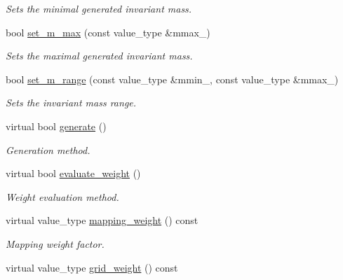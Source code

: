 \begin{DoxyCompactItemize}
\begin{DoxyCompactList}\small\item\em Sets the minimal generated invariant mass. \end{DoxyCompactList}\item 
\hypertarget{a00482_a5df44d35199be994a86c11ba77e98977}{bool \hyperlink{a00482_a5df44d35199be994a86c11ba77e98977}{set\-\_\-m\-\_\-max} (const value\-\_\-type \&mmax\-\_\-)}\label{a00482_a5df44d35199be994a86c11ba77e98977}

\begin{DoxyCompactList}\small\item\em Sets the maximal generated invariant mass. \end{DoxyCompactList}\item 
\hypertarget{a00482_a20f09719b50759cf0a7d9367d399820d}{bool \hyperlink{a00482_a20f09719b50759cf0a7d9367d399820d}{set\-\_\-m\-\_\-range} (const value\-\_\-type \&mmin\-\_\-, const value\-\_\-type \&mmax\-\_\-)}\label{a00482_a20f09719b50759cf0a7d9367d399820d}

\begin{DoxyCompactList}\small\item\em Sets the invariant mass range. \end{DoxyCompactList}\item 
\hypertarget{a00482_a92f18cd4c4b7dc331e9fdfae409e4d08}{virtual bool \hyperlink{a00482_a92f18cd4c4b7dc331e9fdfae409e4d08}{generate} ()}\label{a00482_a92f18cd4c4b7dc331e9fdfae409e4d08}

\begin{DoxyCompactList}\small\item\em Generation method. \end{DoxyCompactList}\item 
\hypertarget{a00482_a81ef54bd4a9621ccd88f7536d72bba59}{virtual bool \hyperlink{a00482_a81ef54bd4a9621ccd88f7536d72bba59}{evaluate\-\_\-weight} ()}\label{a00482_a81ef54bd4a9621ccd88f7536d72bba59}

\begin{DoxyCompactList}\small\item\em Weight evaluation method. \end{DoxyCompactList}\item 
\hypertarget{a00482_a194df3bdb8474f652490e49a94d00bff}{virtual value\-\_\-type \hyperlink{a00482_a194df3bdb8474f652490e49a94d00bff}{mapping\-\_\-weight} () const }\label{a00482_a194df3bdb8474f652490e49a94d00bff}

\begin{DoxyCompactList}\small\item\em Mapping weight factor. \end{DoxyCompactList}\item 
\hypertarget{a00482_a15753b42cb7ab108c3c6468dca24ed01}{virtual value\-\_\-type \hyperlink{a00482_a15753b42cb7ab108c3c6468dca24ed01}{grid\-\_\-weight} () const }\label{a00482_a15753b42cb7ab108c3c6468dca24ed01}


\end{DoxyCompactItemize}

